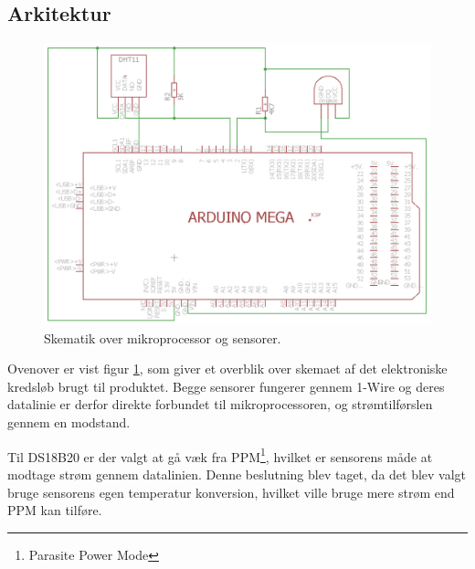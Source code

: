 \subsection{Arkitektur}

\begin{figure}[h!]
 \centering
 \includegraphics[width=1\textwidth]{figures/phase1_schematic.png}
 \caption{Skematik over mikroprocessor og sensorer.}
 \label{p1_skema}
\end{figure}

Ovenover er vist figur \ref{p1_skema}, som giver et overblik over skemaet af det elektroniske kredsløb brugt til produktet.
Begge sensorer fungerer gennem 1-Wire og deres datalinie er derfor direkte forbundet til mikroprocessoren, og strømtilførslen gennem en modstand.

Til DS18B20 er der valgt at gå væk fra PPM\footnote{Parasite Power Mode}, hvilket er sensorens måde at modtage strøm gennem datalinien. Denne beslutning blev taget, da det blev valgt bruge sensorens egen temperatur konversion, hvilket ville bruge mere strøm end PPM kan tilføre.
